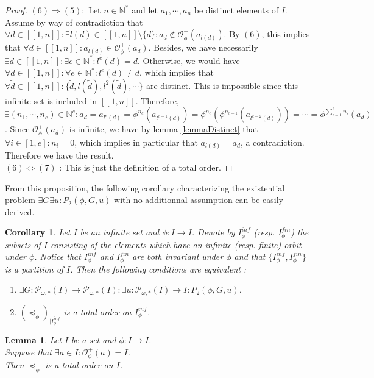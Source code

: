 \documentclass[a4paper,11pt]{article}
\theoremstyle{plain}
\newtheorem{corollary}{Corollary}[section]
\newtheorem{lemma}{Lemma}[section]
\theoremstyle{definition}
\theoremstyle{remark}
\begin{document}
\begin{proof}
$(6) \Rightarrow (5) :$ Let $n \in \mathbb{N}^*$ and let $a_1,\cdots,a_n$ be distinct elements of $I$. Assume by way of contradiction that $\forall d \in [\![1,n]\!] : \exists l(d) \in [\![1,n]\!] \setminus \{d\} : a_d \notin \mathcal{O}^{+}_\phi(a_{l(d)})$. By $(6)$, this implies that $\forall d \in [\![1,n]\!] : a_{l(d)} \in \mathcal{O}^{+}_\phi(a_d)$. Besides, we have necessarily $\exists d \in [\![1,n]\!] : \exists e \in \mathbb{N}^* : l^e(d) = d$. Otherwise, we would have $\forall d \in [\![1,n]\!] : \forall e \in \mathbb{N}^* : l^e(d) \neq d$, which implies that $\forall \widetilde{d} \in [\![1,n]\!] : \{\widetilde{d}, l(\widetilde{d}), l^2(\widetilde{d}), \cdots\}$ are distinct. This is impossible since this infinite set is included in $[\![1,n]\!]$. Therefore, $\exists (n_1,\cdots,n_e) \in \mathbb{N}^e : a_d = a_{l^e(d)} = \phi^{n_e}(a_{l^{e-1}(d)}) = \phi^{n_e}(\phi^{n_{e-1}}(a_{l^{e-2}(d)})) = \cdots = \phi^{\sum_{i=1}^e n_i}(a_d)$. Since $\mathcal{O}^{+}_\phi(a_d)$ is infinite, we have by lemma \ref{lemmaDistinct} that $\forall i \in [1,e] : n_i = 0$, which implies in particular that $a_{l(d)} = a_d$, a contradiction. Therefore we have the result.  \\
$(6) \Leftrightarrow (7)$ : This is just the definition of a total order.
\end{proof}

From this proposition, the following corollary characterizing the existential problem $\exists G \exists u : P_2(\phi,G,u)$ with no additionnal assumption can be easily derived.

 \begin{corollary}
\label{corollaryGuExistEquiv}
Let $I$ be an infinite set and $\phi : I \to I$. Denote by $I_\phi^{inf}$ (resp. $I_\phi^{fin}$) the subsets of $I$ consisting of the elements which have an infinite (resp. finite) orbit under $\phi$. Notice that $I_\phi^{inf}$ and $I_\phi^{fin}$ are both invariant under $\phi$ and that $\{ I_\phi^{inf}, I_\phi^{fin} \}$ is a partition of $I$. Then the following conditions are equivalent :
\begin{enumerate}
\item $\exists G : \mathcal{P}_{\omega,*}(I) \to \mathcal{P}_{\omega,*}(I) : \exists u : \mathcal{P}_{\omega,*}(I) \to I : P_2(\phi,G,u)$.
\item $(\preceq_\phi)_{|I_\phi^{inf}}$ is a total order on $I_\phi^{inf}$.
\end{enumerate}
\end{corollary}

\begin{lemma}
\label{lemmaOrbPhiITotalOrder}
Let $I$ be a set and $\phi : I \to I$. \\
Suppose that $\exists a \in I : \mathcal{O}^{+}_\phi(a) = I$. \\
Then $\preceq_\phi$ is a total order on $I$.
\end{lemma}
\end{document}
